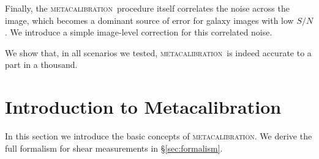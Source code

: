 \documentclass[iop, twocolappendix, appendixfloats, numberedappendix, apj]{emulateapj}
\newcommand{\snr}{$S/N$}
\newcommand{\mcal}{\textsc{metacalibration}}
\begin{document}

Finally, the \mcal\ procedure itself correlates the noise across the image,
which becomes a dominant source of error for galaxy images with low \snr.  We
introduce a simple image-level correction for this correlated noise.

We show that, in all scenarios we tested, \mcal\ is indeed accurate to a part
in a thousand.

\section{Introduction to Metacalibration} \label{sec:mcal}

In this section we introduce the basic concepts of \mcal. We derive the full
formalism for shear measurements in \S \ref{sec:formalism}.
\end{document}
